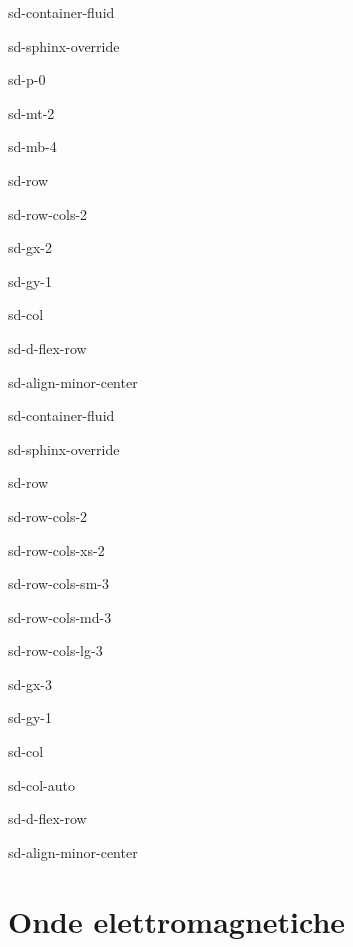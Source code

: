 \documentclass[letterpaper,10pt,english]{jupyterBook}
\begin{document}
\begin{sphinxuseclass}{sd-container-fluid}
\begin{sphinxuseclass}{sd-sphinx-override}
\begin{sphinxuseclass}{sd-p-0}
\begin{sphinxuseclass}{sd-mt-2}
\begin{sphinxuseclass}{sd-mb-4}
\begin{sphinxuseclass}{sd-row}
\begin{sphinxuseclass}{sd-row-cols-2}
\begin{sphinxuseclass}{sd-gx-2}
\begin{sphinxuseclass}{sd-gy-1}
\begin{sphinxuseclass}{sd-col}
\begin{sphinxuseclass}{sd-d-flex-row}
\begin{sphinxuseclass}{sd-align-minor-center}
\begin{sphinxuseclass}{sd-container-fluid}
\begin{sphinxuseclass}{sd-sphinx-override}
\begin{sphinxuseclass}{sd-row}
\begin{sphinxuseclass}{sd-row-cols-2}
\begin{sphinxuseclass}{sd-row-cols-xs-2}
\begin{sphinxuseclass}{sd-row-cols-sm-3}
\begin{sphinxuseclass}{sd-row-cols-md-3}
\begin{sphinxuseclass}{sd-row-cols-lg-3}
\begin{sphinxuseclass}{sd-gx-3}
\begin{sphinxuseclass}{sd-gy-1}
\begin{sphinxuseclass}{sd-col}
\begin{sphinxuseclass}{sd-col-auto}
\begin{sphinxuseclass}{sd-d-flex-row}
\begin{sphinxuseclass}{sd-align-minor-center}
\end{sphinxuseclass}
\end{sphinxuseclass}
\end{sphinxuseclass}
\end{sphinxuseclass}
\end{sphinxuseclass}
\end{sphinxuseclass}
\end{sphinxuseclass}
\end{sphinxuseclass}
\end{sphinxuseclass}
\end{sphinxuseclass}
\end{sphinxuseclass}
\end{sphinxuseclass}
\end{sphinxuseclass}
\end{sphinxuseclass}
\end{sphinxuseclass}
\end{sphinxuseclass}
\end{sphinxuseclass}
\end{sphinxuseclass}
\end{sphinxuseclass}
\end{sphinxuseclass}
\end{sphinxuseclass}
\end{sphinxuseclass}
\end{sphinxuseclass}
\end{sphinxuseclass}
\end{sphinxuseclass}
\end{sphinxuseclass}

\chapter{Onde elettromagnetiche}
\label{\detokenize{ch/waves:onde-elettromagnetiche}}\label{\detokenize{ch/waves:classical-electromagnetism-waves}}\label{\detokenize{ch/waves::doc}}
\sphinxstepscope
\end{document}
